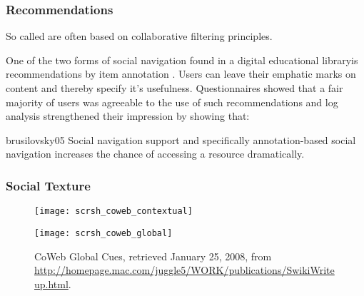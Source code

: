 \subsubsection{Recommendations}
\label{section:background.social.navigation.applied.forms.recommendations}

So called  are often based on collaborative
filtering principles. %

One of the two forms of social navigation found in
\dash{}a digital educational
library\dash{}is recommendations by item
annotation \citep[p.~13]{brusilovsky05}. Users can leave their emphatic marks
on content and thereby specify it's usefulness. Questionnaires showed that a
fair majority of users was agreeable to the use of such recommendations
\citeyearpar[p.~15]{brusilovsky05} and log analysis strengthened their
impression by showing that:

\begin{citequote}[p.~38]{brusilovsky05}
  Social navigation support and specifically
  annotation-based social navigation increases the chance of
  accessing a resource dramatically.
\end{citequote}

\subsubsection{Social Texture}

\begin{figure}
  \captionstyle{\raggedright}
  \begin{whole}
    \begin{minipage}[t]{0.475\wholewidth}
      \texttt{[image: scrsh\_coweb\_contextual]}
      \caption[CoWeb Contextual Cues]{%
        CoWeb Contextual Cues,
        retrieved January 25, 2008, from
        \url{http://homepage.mac.com/juggle5/WORK/publications/SwikiWriteup.html}.
      }
      \label{figure:scrsh.coweb.contextual}
    \end{minipage}
    \hfill
    \begin{minipage}[t]{0.475\wholewidth}
      \texttt{[image: scrsh\_coweb\_global]}
      \caption[CoWeb Global Cues]{%
        CoWeb Global Cues,
        retrieved January 25, 2008, from
        \url{http://homepage.mac.com/juggle5/WORK/publications/SwikiWriteup.html}.
      }
      \label{figure:scrsh.coweb.global}
    \end{minipage}
  \end{whole}
  \normalcaption
\end{figure}

